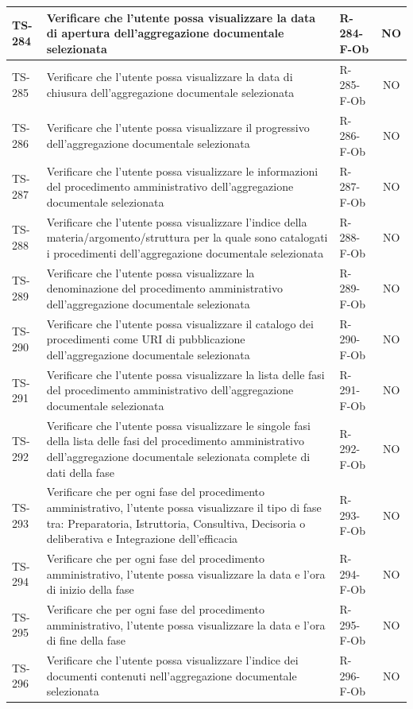 \documentclass[a4paper,12pt]{article}
\begin{document}
\begin{longtable}{|p{1.5cm}|p{8.3cm}|p{2.4cm}|c|}
\hline
TS-284 & Verificare che l'utente possa visualizzare la data di apertura dell'aggregazione documentale selezionata & R-284-F-Ob & NO \\
\hline
TS-285 & Verificare che l'utente possa visualizzare la data di chiusura dell'aggregazione documentale selezionata & R-285-F-Ob & NO \\
\hline
TS-286 & Verificare che l'utente possa visualizzare il progressivo dell'aggregazione documentale selezionata & R-286-F-Ob & NO \\
\hline
TS-287 & Verificare che l'utente possa visualizzare le informazioni del procedimento amministrativo dell'aggregazione documentale selezionata & R-287-F-Ob & NO \\
\hline
TS-288 & Verificare che l'utente possa visualizzare l'indice della materia/argomento/struttura per la quale sono catalogati i procedimenti dell'aggregazione documentale selezionata & R-288-F-Ob & NO \\
\hline
TS-289 & Verificare che l'utente possa visualizzare la denominazione del procedimento amministrativo dell'aggregazione documentale selezionata & R-289-F-Ob & NO \\
\hline
TS-290 & Verificare che l'utente possa visualizzare il catalogo dei procedimenti come URI di pubblicazione dell'aggregazione documentale selezionata & R-290-F-Ob & NO \\
\hline
TS-291 & Verificare che l'utente possa visualizzare la lista delle fasi del procedimento amministrativo dell'aggregazione documentale selezionata & R-291-F-Ob & NO \\
\hline
TS-292 & Verificare che l'utente possa visualizzare le singole fasi della lista delle fasi del procedimento amministrativo dell'aggregazione documentale selezionata complete di dati della fase & R-292-F-Ob & NO \\
\hline
TS-293 & Verificare che per ogni fase del procedimento amministrativo, l'utente possa visualizzare il tipo di fase tra: Preparatoria, Istruttoria, Consultiva, Decisoria o deliberativa e Integrazione dell'efficacia & R-293-F-Ob & NO \\
\hline
TS-294 & Verificare che per ogni fase del procedimento amministrativo, l'utente possa visualizzare la data e l'ora di inizio della fase & R-294-F-Ob & NO \\
\hline
TS-295 & Verificare che per ogni fase del procedimento amministrativo, l'utente possa visualizzare la data e l'ora di fine della fase & R-295-F-Ob & NO \\
\hline
TS-296 & Verificare che l'utente possa visualizzare l'indice dei documenti contenuti nell'aggregazione documentale selezionata & R-296-F-Ob & NO \\

\end{longtable}
\end{document}
